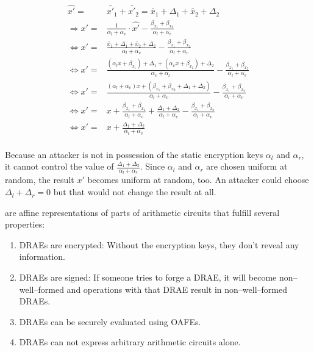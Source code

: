 \begin{align*}
  \widehat{x'} = & \widetilde{x'_1} + \widetilde{x'_2} = \widetilde{x_1} +
  \Delta_1 + \widetilde{x_2} + \Delta_2 \\
  \Rightarrow x' = & \frac{1}{\alpha_l + \alpha_v} \cdot \widehat{x'} -
  \frac{\beta_{x_1} +
  \beta_{x_2}}{\alpha_l + \alpha_v} \\
  \Leftrightarrow x' = & \frac{\widetilde{x_1} + \Delta_1 +
  \widetilde{x_2} + \Delta_2}{\alpha_l + \alpha_v} -
  \frac{\beta_{x_1} +\beta_{x_2}}{\alpha_l + \alpha_v}\\
  \Leftrightarrow x' = & \frac{(\alpha_l x + \beta_{x_1}) + \Delta_1 +
  (\alpha_v x + \beta_{x_2}) + \Delta_2}{\alpha_v + \alpha_l} -
  \frac{\beta_{x_1} +\beta_{x_2}}{\alpha_l + \alpha_v} \\
  \Leftrightarrow x' = & \frac{(\alpha_l+\alpha_v)x + (\beta_{x_1}+\beta_{x_2} +
  \Delta_1+\Delta_2)}{\alpha_l+\alpha_v} -
  \frac{\beta_{x_1} +\beta_{x_2}}{\alpha_l + \alpha_v} \\
  \Leftrightarrow x' = & x + \frac{\beta_{x_1}+\beta_{x_2}}{\alpha_l+\alpha_v}
  + \frac{\Delta_1 + \Delta_2}{\alpha_l + \alpha_v} -
  \frac{\beta_{x_1}+\beta_{x_2}}{\alpha_l + \alpha_v} \\
  \Leftrightarrow x' = & x + \frac{\Delta_1 + \Delta_2}{\alpha_l + \alpha_v}\\
\end{align*}

Because an attacker is not in possession of the static encryption keys
$\alpha_l$ and $\alpha_r$, it cannot control the value of $\frac{\Delta_1 +
\Delta_2}{\alpha_l + \alpha_r}$. Since $\alpha_l$ and $\alpha_r$ are chosen
uniform at random, the result $x'$ becomes uniform at random, too. An attacker
could choose $\Delta_l + \Delta_r = 0$ but that would not change the result at
all.


%
%
\label{sec:drae}

 are affine representations of
parts of arithmetic circuits that fulfill several properties:

\begin{enumerate}

  \item \label{prop:drae-encrypted} DRAEs are encrypted: Without the encryption
    keys, they don't reveal any information.

  \item \label{prop:drae-signed} DRAEs are signed: If someone tries to forge a
    DRAE, it will become non--well--formed and operations with that DRAE result
    in non--well--formed DRAEs.

  \item \label{prop:drae-oafe} DRAEs can be securely evaluated using OAFEs.

  \item \label{prop:drae-not-enough} DRAEs can not express arbitrary arithmetic
    circuits alone.

\end{enumerate}

